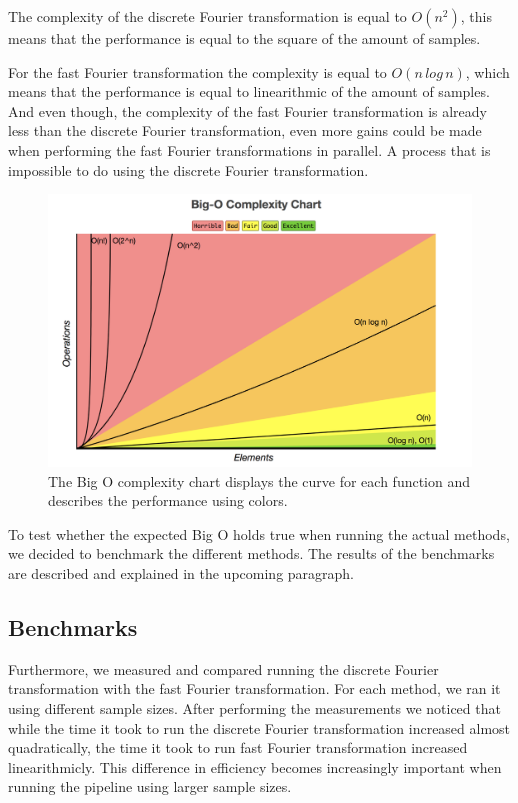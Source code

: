 \documentclass[a4paper,11pt]{report}
\begin{document}
    The complexity of the discrete Fourier transformation is equal to $O(n^2)$, this means that the performance is equal to the square of the amount of samples.
    
    For the fast Fourier transformation the complexity is equal to $O(n\,log\,n)$, which means that the performance is equal to linearithmic of the amount of samples.
    And even though, the complexity of the fast Fourier transformation is already less than the discrete Fourier transformation, even more gains could be made when
    performing the fast Fourier transformations in parallel. A process that is impossible to do using the discrete Fourier transformation.

    \begin{figure}[h!]
        \centering
        \includegraphics[width=1\columnwidth]{big_o_complexity_chart}
        \caption{The Big O complexity chart displays the curve for each function and describes the performance using colors.}
    \end{figure}

    To test whether the expected Big O holds true when running the actual methods, we decided to benchmark the different methods. The results of the benchmarks are described
    and explained in the upcoming paragraph.

    \subsection{Benchmarks}
    
    Furthermore, we measured and compared running the discrete Fourier transformation with the fast Fourier transformation. For each method, we ran it using different sample sizes.
    After performing the measurements we noticed that while the time it took to run the discrete Fourier transformation increased almost quadratically, the time it took to run fast 
    Fourier transformation increased linearithmicly. This difference in efficiency becomes increasingly important when running the pipeline using larger sample sizes.
\end{document}

